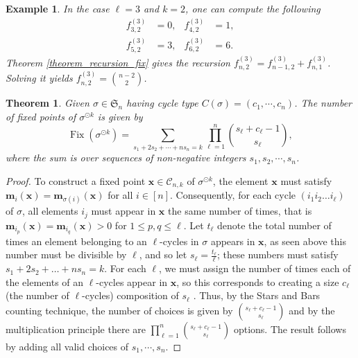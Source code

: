 \documentclass[12pt]{amsart}
\newtheorem{theorem}{Theorem}[section]
\newtheorem{example}{Example}{}
\newcommand{\fix}{\operatorname{Fix}}
\begin{document}
    \begin{example}
        In the case $\ell = 3$ and  $k = 2$, one can compute the following
        \begin{align*}
            f ^{(3)}_{3,2} &= 0, &f ^{(3)}_{4,2} &= 1,\\
            f ^{(3)}_{5,2} &= 3, &f ^{(3)}_{6,2} &= 6.
        \end{align*}
        Theorem \ref{theorem_recursion_fix} gives the recursion $f ^{(3)}_{n,2} = f ^{(3)}_{n-1,2} + f ^{(3)}_{n,1}$. Solving it yields $f ^{(3)}_{n,2} = \binom{n-2}{2}$.
    \end{example}

\noindent
    \begin{theorem}
    \label{theo:generalFix}
    Given $\sigma \in \mathfrak{S}_n$ having cycle type $C(\sigma )=(c_1,\cdots ,c_n)$. The number of fixed points of $\sigma ^{\odot k}$ is given by
    $$\fix \left (\sigma ^{\odot k} \right )=\sum _ {s_1+2s_2+\cdots +ns_n=k}\prod _{\ell = 1}^n \binom{s_{\ell}+c_{\ell}-1}{s_{\ell}},$$
    where the sum is over sequences of non-negative integers $s_1,s_2,\cdots , s_n$.
\end{theorem}
\begin{proof}
    To construct a fixed point $\mathbf{x} \in \mathcal{C}_{n, k}$ of $\sigma^{\odot k}$, the element $\mathbf{x}$ must satisfy $\mathbf{m}_{i}(\mathbf{x}) = \mathbf{m}_{\sigma(i)}(\mathbf{x})$ for all $i \in [n]$. Consequently, for each cycle $(i_1i_2\dots i_\ell)$ of $\sigma$, all elements $i_j$ must appear in $\mathbf{x}$ the same number of times, that is $\textbf{m}_{i_p}(\textbf{x}) = \textbf{m}_{i_q}(\textbf{x})>0$ for $1\leq p,q\leq \ell$. Let $t_{\ell}$ denote the total number of times an element belonging to an $\ell$-cycles in $\sigma$ appears in $\textbf{x}$, as seen above this number must be divisible by $\ell$, and so let $s_{\ell} = \frac{t_{\ell}}{\ell}$; these numbers must satisfy $s_1 + 2s_2 + \dots+ns_n = k$. For each $\ell$, we must assign the number of times each of the elements of an $\ell$-cycles appear in $\textbf{x}$, so this corresponds to creating a size $c_{\ell}$ (the number of $\ell$-cycles) composition of $s_{\ell}$ . Thus, by the Stars and Bars counting technique, the number of choices is given by $\displaystyle \binom{s_\ell + c_\ell - 1}{s_\ell}$ and by the multiplication principle there are
        $\displaystyle \prod_{\ell = 1}^n \binom{s_{\ell} + c_{\ell} - 1}{s_{\ell}}$ options.
     The result follows by adding all valid choices of $s_1,\cdots ,s_n$.
\end{proof}
\end{document}
